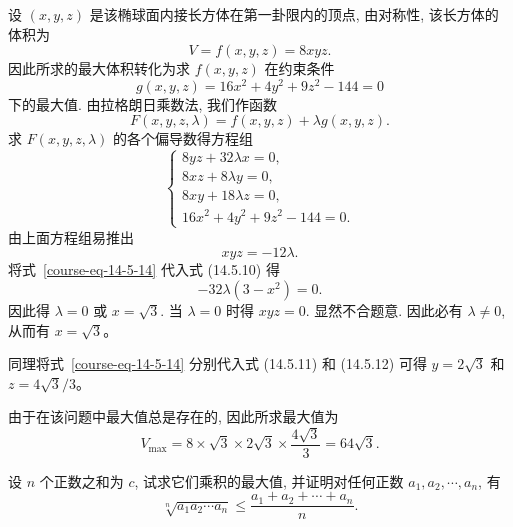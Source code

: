 \documentclass[UTF8,12pt,a4paper,fontset=fandol]{ctexart}
\begin{document}
\begin{solve}\quad 设 $(x,y,z)$ 是该椭球面内接长方体在第一卦限内的顶点, 由对称性, 该长方体的体积为
\[
  V=f(x,y,z)=8xyz.
\]
因此所求的最大体积转化为求 $f(x,y,z)$ 在约束条件
\[
  g(x,y,z)=16x^2+4y^2+9z^2-144=0
\]
下的最大值. 由拉格朗日乘数法, 我们作函数
\[
  F(x,y,z,\lambda)=f(x,y,z)+\lambda g(x,y,z).
\]
求 $F(x,y,z,\lambda)$ 的各个偏导数得方程组
\[
  \begin{cases}
    8yz+32\lambda x=0,\\
    8xz+8\lambda y=0,\\
    8xy+18\lambda z=0,\\
    16x^2+4y^2+9z^2-144=0.
  \end{cases}
  \label{course-eq-lagrange-box}
\]
由上面方程组易推出
\begin{equation}
  xyz=-12\lambda.
  \label{course-eq-14-5-14}
\end{equation}
将式~\eqref{course-eq-14-5-14}  代入式 (14.5.10) 得
\[
  -32\lambda(3-x^2)=0.
\]
因此得 $\lambda=0$ 或 $x=\sqrt3$. 当 $\lambda=0$ 时得 $xyz=0$. 显然不合题意. 因此必有 $\lambda\ne0$, 从而有 $x=\sqrt3$。

同理将式~\eqref{course-eq-14-5-14}  分别代入式 (14.5.11) 和 (14.5.12) 可得 $y=2\sqrt3$ 和 $z=4\sqrt3/3$。

由于在该问题中最大值总是存在的, 因此所求最大值为
\[
  V_{\max}=8\times\sqrt3\times2\sqrt3\times\frac{4\sqrt3}{3}=64\sqrt3.
\]

\end{solve}
\begin{example}\label{course-example-14-5-5}\quad 设 $n$ 个正数之和为 $c$, 试求它们乘积的最大值, 并证明对任何正数 $a_1,a_2,\cdots,a_n$, 有
\[
  \sqrt[n]{a_1a_2\cdots a_n}
  \leqslant
  \frac{a_1+a_2+\cdots+a_n}{n}.
\]

\end{example}
\end{document}
